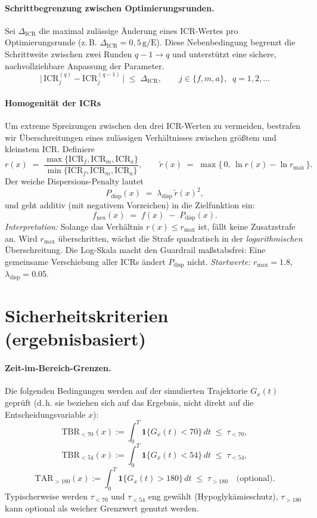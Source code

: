 \documentclass[ngerman,a4paper,12pt,pdftex]{article}
\newcommand{\Ind}{\mathbf{1}}
\newcommand{\ICR}{\mathrm{ICR}}
\newcommand{\ICRf}{\mathrm{ICR}_f}
\newcommand{\ICRm}{\mathrm{ICR}_m}
\newcommand{\ICRa}{\mathrm{ICR}_a}
\newcommand{\DICR}{\Delta_{\mathrm{ICR}}}
\newcommand{\rmax}{r_{\max}}
\newcommand{\lambdadisp}{\lambda_{\mathrm{disp}}}
\begin{document}

\paragraph{Schrittbegrenzung zwischen Optimierungsrunden.} Sei \(\DICR\) die maximal zulässige Änderung eines \(\ICR\)-Wertes pro Optimierungsrunde (z.\,B. \(\DICR=0{,}5\,\mathrm{g}/\mathrm{E}\)). Diese Nebenbedingung begrenzt die Schrittweite zwischen zwei Runden \(q-1 \to q\) und unterstützt eine sichere, nachvollziehbare Anpassung der Parameter.
\[
\bigl|\,\ICR_j^{(q)} - \ICR_j^{(q-1)}\,\bigr| \;\le\; \DICR,
\qquad j \in \{f,m,a\},\;\; q=1,2,\dots
\]

\medskip

\paragraph{Homogenität der ICRs}
Um extreme Spreizungen zwischen den drei ICR-Werten zu vermeiden, bestrafen wir
Überschreitungen eines zulässigen Verhältnisses zwischen größtem und kleinstem ICR.
Definiere
\[
r(x)\;=\;\frac{\max\{\ICRf,\ICRm,\ICRa\}}{\min\{\ICRf,\ICRm,\ICRa\}},
\qquad
\tilde r(x)\;=\;\max\{\,0,\,\ln r(x)-\ln \rmax\,\}.
\]
Der weiche Dispersions-Penalty lautet
\[
P_{\mathrm{disp}}(x)\;=\;\lambdadisp\,\tilde r(x)^{2},
\]
und geht additiv (mit negativem Vorzeichen) in die Zielfunktion ein:
\[
f_{\text{neu}}(x)\;=\;f(x)\;-\;P_{\mathrm{disp}}(x).
\]
\noindent
\textit{Interpretation:} Solange das Verhältnis \(r(x)\le\rmax\) ist, fällt keine Zusatzstrafe an.
Wird \(\rmax\) überschritten, wächst die Strafe quadratisch in der \emph{logarithmischen} Überschreitung.
Die Log-Skala macht den Guardrail maßstabsfrei: Eine gemeinsame Verschiebung aller ICRs
ändert \(P_{\mathrm{disp}}\) nicht. \textit{Startwerte:} \(\rmax=1.8\), \(\lambdadisp=0.05\).

\section{Sicherheitskriterien (ergebnisbasiert)}

\paragraph{Zeit-im-Bereich-Grenzen.} Die folgenden Bedingungen werden auf der simulierten Trajektorie \(G_x(t)\) geprüft (d.\,h. sie beziehen sich auf das Ergebnis, nicht direkt auf die Entscheidungsvariable \(x\)):
\[
\mathrm{TBR}_{<70}(x) := \int_0^T \Ind\{G_x(t)<70\}\,dt \;\le\; \tau_{<70},
\]
\[
\mathrm{TBR}_{<54}(x) := \int_0^T \Ind\{G_x(t)<54\}\,dt \;\le\; \tau_{<54},
\]
\[
\mathrm{TAR}_{>180}(x) := \int_0^T \Ind\{G_x(t)>180\}\,dt \;\le\; \tau_{>180}\quad \text{(optional)}.
\]
\noindent Typischerweise werden \(\tau_{<70}\) und \(\tau_{<54}\) eng gewählt (Hypoglykämieschutz), \(\tau_{>180}\) kann optional als weicher Grenzwert genutzt werden.
\end{document}

